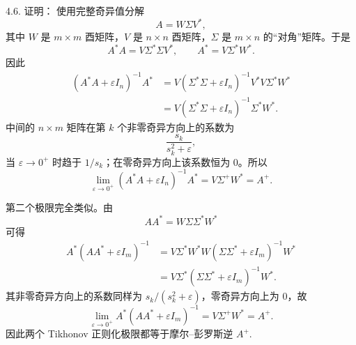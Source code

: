 \begin{exer}
4.6. 证明：
使用完整奇异值分解
$$A=W\Sigma V^*,$$
其中 $W$ 是 $m\times m$ 酉矩阵，$V$ 是 $n\times n$ 酉矩阵，$\Sigma$ 是 $m\times n$ 的“对角”矩阵。于是
$$A^*A=V\Sigma^*\Sigma V^*,\qquad A^*=V\Sigma^*W^*.$$
因此
\begin{align*}
(A^*A+\varepsilon I_n)^{-1}A^*
&=V(\Sigma^*\Sigma+\varepsilon I_n)^{-1}V^*V\Sigma^*W^*\\
&=V(\Sigma^*\Sigma+\varepsilon I_n)^{-1}\Sigma^*W^*.
\end{align*}
中间的 $n\times m$ 矩阵在第 $k$ 个非零奇异方向上的系数为
$$\frac{s_k}{s_k^2+\varepsilon},$$
当 $\varepsilon\to0^+$ 时趋于 $1/s_k$；在零奇异方向上该系数恒为 $0$。所以
$$\lim_{\varepsilon\to0^+}(A^*A+\varepsilon I_n)^{-1}A^*
=V\Sigma^+W^*=A^+.$$

第二个极限完全类似。由
$$AA^*=W\Sigma\Sigma^*W^*$$
可得
\begin{align*}
A^*(AA^*+\varepsilon I_m)^{-1}
&=V\Sigma^*W^*W(\Sigma\Sigma^*+\varepsilon I_m)^{-1}W^*\\
&=V\Sigma^*(\Sigma\Sigma^*+\varepsilon I_m)^{-1}W^*.
\end{align*}
其非零奇异方向上的系数同样为 $s_k/(s_k^2+\varepsilon)$，零奇异方向上为 $0$，故
$$\lim_{\varepsilon\to0^+}A^*(AA^*+\varepsilon I_m)^{-1}=V\Sigma^+W^*=A^+.$$
因此两个 Tikhonov 正则化极限都等于摩尔--彭罗斯逆 $A^+$.
\vspace{5ex}


\end{exer}
